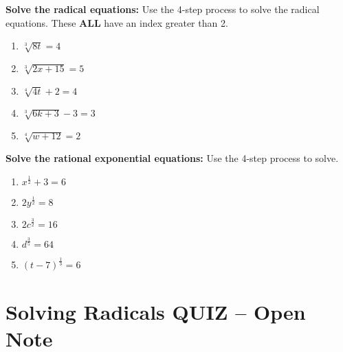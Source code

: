 \documentclass[12pt]{article}
\begin{document}
\hrulefill

\textbf{Solve the radical equations:} Use the 4-step process to solve the radical equations. These \textbf{ALL} have an index greater than 2.\\

\begin{enumerate}[resume]

	\item $\sqrt[3]{8t}=4$\\
	
	
	\item $\sqrt[3]{2x+15}=5$\\
	
	
	\item $\sqrt[4]{4t}+2=4$\\
	
	
	\item $\sqrt[3]{6k+3}-3=3$\\
	
	
	\item $\sqrt[4]{w+12}=2$\\

\end{enumerate}

\pagebreak

\textbf{Solve the rational exponential equations:} Use the 4-step process to solve.\\

\begin{enumerate}[resume]

	\item $x^{\frac{1}{2}}+3=6$\\
	
	\item $2y^{\frac{1}{2}}=8$\\
	
	\item $2c^{\frac{3}{2}}=16$\\
	
	\item $d^{\frac{3}{5}}=64$\\
	
	\item $(t-7)^{\frac{1}{3}}=6$\\


\end{enumerate}

\pagebreak

\section{Solving Radicals QUIZ -- Open Note}
\end{document}
